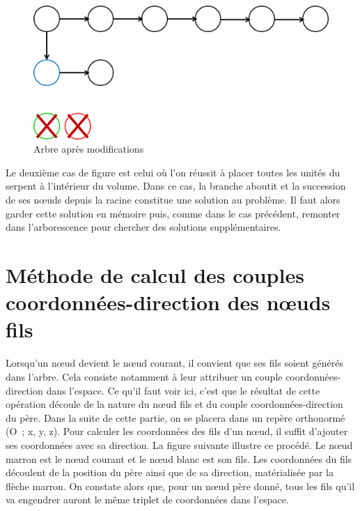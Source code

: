 \newpage

\begin{figure}[h]
 \centering
 \includegraphics[scale=0.3,keepaspectratio=true]{img/pathAfter.png}
 \caption{Arbre après modifications}
 \label{pathAfter}
\end{figure}

Le deuxième cas de figure est celui où l’on réussit à placer toutes les unités du serpent à l’intérieur du volume. Dans ce cas, la branche aboutit et la succession de ses nœuds depuis la racine constitue une solution au problème. Il faut alors garder cette solution en mémoire puis, comme dans le cas précédent, remonter dans l’arborescence pour chercher des solutions supplémentaires. 

\section{Méthode de calcul des couples coordonnées-direction des nœuds fils}
Lorsqu’un nœud devient le nœud courant, il convient que ses fils soient générés dans l’arbre. Cela consiste notamment à leur attribuer un couple coordonnées-direction dans l’espace. Ce qu’il faut voir ici, c’est que le résultat de cette opération découle de la nature du nœud fils et du couple coordonnées-direction du père. Dans la suite de cette partie, on se placera dans un repère orthonormé (O ; x, y, z). 
Pour calculer les coordonnées des fils d’un nœud, il suffit d’ajouter ses coordonnées avec sa direction. La figure suivante illustre ce procédé. Le nœud marron est le nœud courant et le nœud blanc est son fils. Les coordonnées du fils découlent de la position du père ainsi que de sa direction, matérialisée par la flèche marron. On constate alors que, pour un nœud père donné, tous les fils qu’il va engendrer auront le même triplet de coordonnées dans l’espace. 

